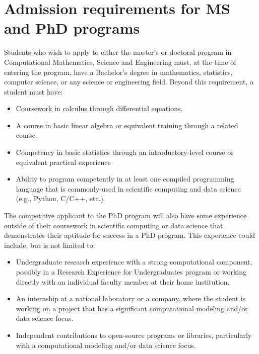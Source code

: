 \section{Admission requirements for MS and PhD programs}
\label{sec:grad_admission}

Students who wish to apply to either the master's or doctoral program in Computational
Mathematics, Science and Engineering must, at the time of entering
the program, have a Bachelor's degree in mathematics, statistics,
computer science, or any science or engineering field.  Beyond this
requirement, a student must have:

\begin{itemize}
\item Coursework in calculus through differential equations.

\item A course in basic linear algebra or equivalent training through
  a related course.

\item Competency in basic statistics through an introductory-level
  course or equivalent practical
  experience

\item Ability to program competently in at least one
  compiled programming language that is commonly-used in scientific
  computing and data science
  (e.g., Python, C/C++, etc.)

\end{itemize}

The competitive applicant to the PhD program will also have some experience outside of
their coursework in scientific computing or data science that
demonstrates their aptitude for success in a PhD program.  This
experience could include, but is not limited to:  

\begin{itemize}
\item Undergraduate research experience with a strong computational
  component, possibly in a Research Experience for Undergraduates program or working directly with an
  individual faculty member at their home institution.

\item An internship at a national laboratory or a company, where the
  student is working on a
  project that has a significant computational modeling and/or data
  science focus.

\item Independent contributions to open-source programs or libraries,
  particularly with a computational modeling and/or data science
  focus.
\end{itemize}

